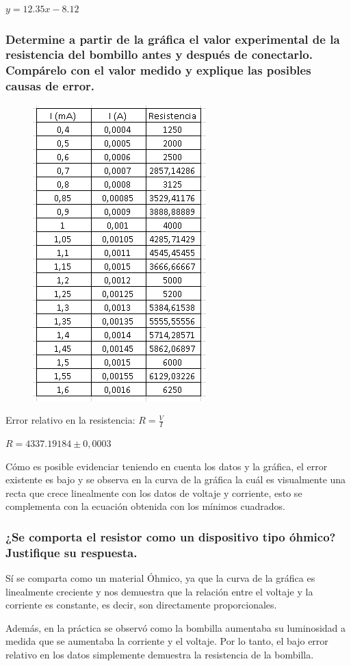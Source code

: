 \documentclass[10pt]{article}
\begin{document}
\begin{multicols}{2}
	$y = 12.35x - 8.12$

	\subsubsection*{Determine a partir de la gráfica el valor experimental de la resistencia del bombillo antes y
		después de conectarlo. Compárelo con el valor medido y explique las posibles causas de error. }

	\begin{figure}[H]
		\includegraphics[width = 0.5\linewidth]{./Images/Resistencias.PNG}
	\end{figure}

	Error relativo en la resistencia: $R = \frac{V}{I}$ \hfill \break{}

	$R = 4337.19184 \pm 0,0003$

	Cómo es posible evidenciar teniendo en cuenta los datos y la gráfica, el
	error existente es bajo y se observa en la curva de la gráfica la cuál es
	visualmente una recta que crece linealmente con los datos de voltaje y
	corriente, esto se complementa con la ecuación obtenida con los mínimos
	cuadrados.

	\subsubsection*{¿Se comporta el resistor como un dispositivo tipo óhmico? Justifique su respuesta. }

	Sí se comparta como un material Óhmico, ya que la curva de la gráfica es
	linealmente creciente y nos demuestra que la relación entre el voltaje y
	la corriente es constante, es decir, son directamente proporcionales.

	Además, en la práctica se observó como la bombilla aumentaba su luminosidad
	a medida que se aumentaba la corriente y el voltaje. Por lo tanto, el bajo
	error relativo en los datos simplemente demuestra la resistencia de la
	bombilla.

\end{multicols}
\end{document}

